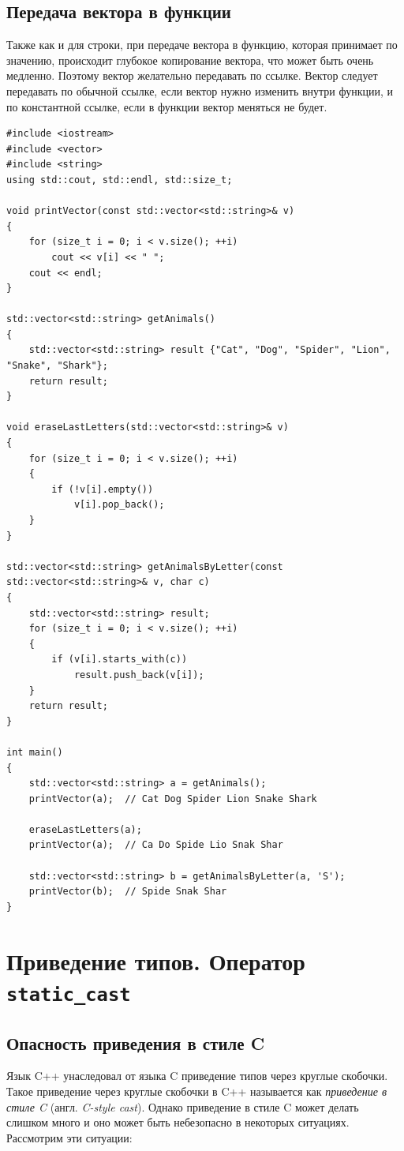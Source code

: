 \documentclass{article}
\begin{document}
\subsection*{Передача вектора в функции}
Также как и для строки, при передаче вектора в функцию, которая принимает по значению, происходит глубокое копирование вектора, что может быть очень медленно. Поэтому вектор желательно передавать по ссылке. Вектор следует передавать по обычной ссылке, если вектор нужно изменить внутри функции, и по константной ссылке, если в функции вектор меняться не будет.
\begin{lstlisting}
#include <iostream>
#include <vector>
#include <string>
using std::cout, std::endl, std::size_t;

void printVector(const std::vector<std::string>& v)
{
    for (size_t i = 0; i < v.size(); ++i)
        cout << v[i] << " ";
    cout << endl;
}

std::vector<std::string> getAnimals()
{
    std::vector<std::string> result {"Cat", "Dog", "Spider", "Lion", "Snake", "Shark"};
    return result;
}

void eraseLastLetters(std::vector<std::string>& v)
{
    for (size_t i = 0; i < v.size(); ++i)
    {
        if (!v[i].empty())
            v[i].pop_back();
    }
}

std::vector<std::string> getAnimalsByLetter(const std::vector<std::string>& v, char c)
{
    std::vector<std::string> result;
    for (size_t i = 0; i < v.size(); ++i)
    {
        if (v[i].starts_with(c))
            result.push_back(v[i]);
    }
    return result;
}

int main()
{
    std::vector<std::string> a = getAnimals();
    printVector(a);  // Cat Dog Spider Lion Snake Shark
    
    eraseLastLetters(a);
    printVector(a);  // Ca Do Spide Lio Snak Shar
    
    std::vector<std::string> b = getAnimalsByLetter(a, 'S');
    printVector(b);  // Spide Snak Shar
}
\end{lstlisting}






\newpage
\section*{Приведение типов. Оператор \texttt{static\_cast}}

\subsection*{Опасность приведения в стиле C}
Язык C++ унаследовал от языка C приведение типов через круглые скобочки.
Такое приведение через круглые скобочки в C++ называется как \textit{приведение в стиле C} (англ. \textit{C-style cast}).
Однако приведение в стиле C может делать слишком много и оно может быть небезопасно в некоторых ситуациях. Рассмотрим эти ситуации:
\end{document}
